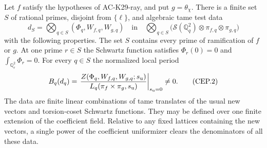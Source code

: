 \begin{lemma}
\label{AC-K29-primitive-data}
Let $f$ satisfy the hypotheses of AC-K29-ray, and put
$g=\theta_\chi$.  There is a finite set $S$ of rational primes,
disjoint from $\{\ell\}$, and algebraic tame test data
\[
 d_S=\bigotimes_{q\in S}(\Phi_q,W_{f,q},W_{g,q})
 \quad\text{in}\quad
 \bigotimes_{q\in S}
 \bigl(\mathcal S(\mathbb Q_q^2)\otimes\pi_{f,q}
                       \otimes\pi_{g,q}\bigr)
                                                        \tag{CEP.1}
\]
with the following properties.
The set $S$ contains every prime of ramification of $f$ or $g$.
At one prime $r\in S$ the Schwartz function satisfies
$\Phi_r(0)=0$ and $\int_{\mathbb Q_r^2}\Phi_r=0$.
For every $q\in S$ the normalized local period
\[
 B_q(d_q)=
 \left.
 \frac{Z(\Phi_q,W_{f,q},W_{g,q};s_{\rm u})}
      {L_q(\pi_f\times\pi_g,s_{\rm u})}
 \right|_{s_{\rm u}=0}
 \ne0.                                                   \tag{CEP.2}
\]
The data are finite linear combinations of tame translates
of the usual new vectors and torsion-coset Schwartz functions.
They may be defined over one finite extension of the coefficient
field.  Relative to any fixed lattices containing the new
vectors, a single power of the coefficient uniformizer clears
the denominators of all these data.
\end{lemma}
